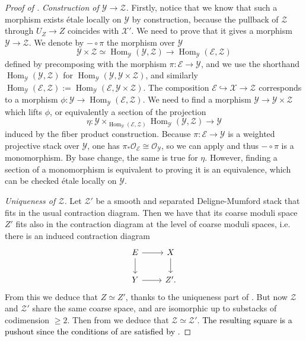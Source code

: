\documentclass{amsart}
\newcommand{\cE}{\mathcal{E}}
\newcommand{\cO}{\mathcal{O}}
\newcommand{\cX}{\mathcal{X}}
\newcommand{\cY}{\mathcal{Y}}
\newcommand{\cZ}{\mathcal{Z}}
\newcommand{\Hom}{\operatorname{Hom}}
\theoremstyle{definition}
\begin{document}
\begin{proof}[Proof of ]
    \textit{Construction of $\cY\to \cZ$.} 
    Firstly, notice that we know that such a morphism exists \'etale locally on $\cY$ by construction, because the pullback of $\cZ$ through $U_Z\rightarrow Z$ coincides with $\cX'$. We need to prove that it gives a morphism $\cY \rightarrow \cZ$.
    We denote by $- \circ \pi$ the morphism over $\cY$ $$\cY \times \cZ \simeq \Hom_{\cY}(\cY,\cZ) \longrightarrow \Hom_{\cY}(\cE,\cZ)$$
    defined by precomposing with the morphism $\pi:\cE \rightarrow \cY$, and we use the shorthand $\Hom_{\cY}(\cY,\cZ)$ for $\Hom_{\cY}(\cY,\cY\times \cZ)$, and similarly $\Hom_{\cY}(\cE,\cZ):=\Hom_{\cY}(\cE,\cY\times\cZ)$.
    The composition $\cE \hookrightarrow \cX \rightarrow \cZ$ corresponds to a morphism $\phi:\cY \rightarrow \Hom_{\cY}(\cE,\cZ)$. We need to find a morphism $\cY \rightarrow \cY \times \cZ$ which lifts $\phi$, or equivalently a section of the projection 
    $$\eta:\cY \times_{\Hom_{\cY}(\cE,\cZ)} \Hom_{\cY}(\cY,\cZ) \rightarrow \cY$$ induced by the fiber product construction. Because $\pi:\cE \rightarrow \cY$ is a weighted projective stack over $\cY$, one has $\pi_*\cO_\cE\cong \cO_\cY$, so we can apply  and thus $-\circ \pi$ is a monomorphism. By base change, the same is true for $\eta$. However, finding a section of a monomorphism is equivalent to proving it is an equivalence, which can be checked \'etale locally on $\cY$.
   
    
    \textit{Uniqueness of $\cZ$.} Let $\cZ'$ be a smooth and separated Deligne-Mumford stack that fits in the usual contraction diagram. Then we have that its coarse moduli space $Z'$ fits also in the contraction diagram at the level of coarse moduli spaces, i.e. there is an induced contraction diagram
    \[ 
    \begin{tikzcd}
        E \ar[r] \ar[d] & X \ar[d] \\
        Y \ar[r] & Z'.
    \end{tikzcd} \\
    \]
    From this we deduce that $Z\simeq Z'$, thanks to the uniqueness part of . But now $\cZ$ and $\cZ'$ share the same coarse space, and are isomorphic up to substacks of codimension $\geq 2$. Then from  we deduce that $\cZ\simeq \cZ'$. \textcolor{black}{The resulting square is a pushout since the conditions of  are satisfied by .}
\end{proof}
\end{document}
